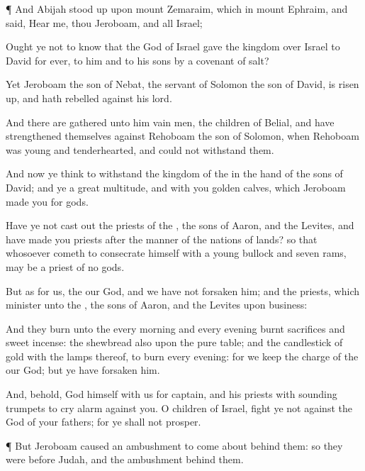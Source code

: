 {\par }{\PP {}¶ And
Abijah stood
up upon
mount
Zemaraim, which
{} in
mount
Ephraim, and
said,
Hear me, thou
Jeroboam, and all
Israel;

Ought ye not to
know that the
{}
God of
Israel
gave the
kingdom over
Israel to
David for
ever,
{} to him and to his
sons by a
covenant of
salt?

Yet
Jeroboam the
son of
Nebat, the
servant of
Solomon the
son of
David, is risen
up, and hath
rebelled against his
lord.

And there are
gathered unto him
vain
men, the
children of
Belial, and have
strengthened themselves against
Rehoboam the
son of
Solomon, when
Rehoboam was
young and
tenderhearted, and could not
withstand
them.

And now ye
think to
withstand the
kingdom of the
{} in the
hand of the
sons of
David; and ye
{} a
great
multitude, and
{} with you
golden
calves, which
Jeroboam
made you for
gods.

Have ye not cast
out the
priests of the
{}, the
sons of
Aaron, and the
Levites, and have
made you
priests after the manner of the
nations of
{}
lands? so that whosoever
cometh to
consecrate himself with a
young
bullock and
seven
rams,
{} may be a
priest of
{}
no
gods.

But as for us, the
{}
{} our
God, and we have not
forsaken him; and the
priests, which
minister unto the
{},
{} the
sons of
Aaron, and the
Levites
{} upon
{}
business:

And they
burn unto the
{} every
morning and every
evening burnt
sacrifices and
sweet
incense: the
shewbread also
{} upon the
pure
table; and the
candlestick of
gold with the
lamps thereof, to
burn every
evening: for we
keep the
charge of the
{} our
God; but ye have
forsaken him.

And, behold,
God himself
{} with us for
{}
captain, and his
priests with
sounding
trumpets to cry
alarm against you. O
children of
Israel,
fight ye not against the
{}
God of your
fathers; for ye shall not
prosper.


\par }{\PP {}¶ But
Jeroboam caused an
ambushment to
come
about
behind them: so they were
before
Judah, and the
ambushment
{}
behind them.

}
